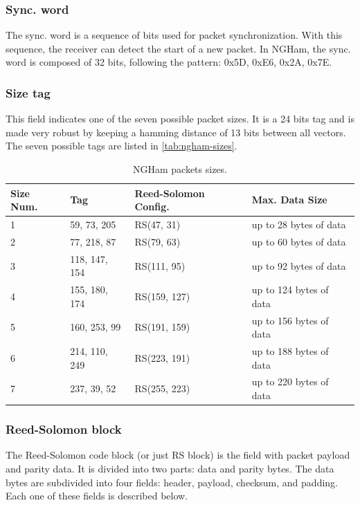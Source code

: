 \subsubsection{Sync. word}

The sync. word is a sequence of bits used for packet synchronization. With this sequence, the receiver can detect the start of a new packet. In NGHam, the sync. word is composed of 32 bits, following the pattern: 0x5D, 0xE6, 0x2A, 0x7E.

\subsubsection{Size tag}

This field indicates one of the seven possible packet sizes. It is a 24 bits tag and is made very robust by keeping a hamming distance of 13 bits between all vectors. The seven possible tags are listed in \autoref{tab:ngham-sizes}.

\begin{table}[!ht]
    \centering
    \begin{tabular}{llll}
        \toprule[1.5pt]
        \textbf{Size Num.} & \textbf{Tag} & \textbf{Reed-Solomon Config.} & \textbf{Max. Data Size} \\
        \midrule
        1 & 59, 73, 205   & RS(47, 31)   & up to 28 bytes of data \\
        2 & 77, 218, 87   & RS(79, 63)   & up to 60 bytes of data \\
        3 & 118, 147, 154 & RS(111, 95)  & up to 92 bytes of data \\
        4 & 155, 180, 174 & RS(159, 127) & up to 124 bytes of data \\
        5 & 160, 253, 99  & RS(191, 159) & up to 156 bytes of data \\
        6 & 214, 110, 249 & RS(223, 191) & up to 188 bytes of data \\
        7 & 237, 39, 52   & RS(255, 223) & up to 220 bytes of data \\
        \bottomrule[1.5pt]
    \end{tabular}
    \caption{NGHam packets sizes.}
    \label{tab:ngham-sizes}
\end{table}

\subsubsection{Reed-Solomon block}

The Reed-Solomon code block (or just RS block) is the field with packet payload and parity data. It is divided into two parts: data and parity bytes. The data bytes are subdivided into four fields: header, payload, checksum, and padding. Each one of these fields is described below.

